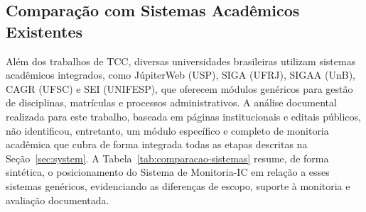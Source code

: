 \documentclass[portuguese]{sbc2025}%
\begin{document}
\subsection{Comparação com Sistemas Acadêmicos Existentes}

Além dos trabalhos de TCC, diversas universidades brasileiras utilizam sistemas acadêmicos integrados, como JúpiterWeb (USP), SIGA (UFRJ), SIGAA (UnB), CAGR (UFSC) e SEI (UNIFESP), que oferecem módulos genéricos para gestão de disciplinas, matrículas e processos administrativos. A análise documental realizada para este trabalho, baseada em páginas institucionais e editais públicos, não identificou, entretanto, um módulo específico e completo de monitoria acadêmica que cubra de forma integrada todas as etapas descritas na Seção~\ref{sec:system}. A Tabela~\ref{tab:comparacao-sistemas} resume, de forma sintética, o posicionamento do Sistema de Monitoria-IC em relação a esses sistemas genéricos, evidenciando as diferenças de escopo, suporte à monitoria e avaliação documentada.
\end{document}
